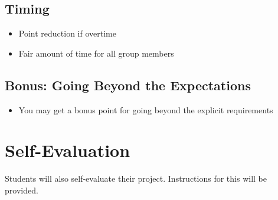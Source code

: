 \documentclass[11pt,a4paper]{article}
\begin{document}
\subsection{Timing}
\begin{itemize}[label=--]
    \item Point reduction if overtime
    \item Fair amount of time for all group members
\end{itemize}

\subsection{Bonus: Going Beyond the Expectations}
\begin{itemize}[label=--]
    \item You may get a bonus point for going beyond the explicit requirements
\end{itemize}

\section{Self-Evaluation}

Students will also self-evaluate their project. Instructions for this will be provided.
\end{document}
